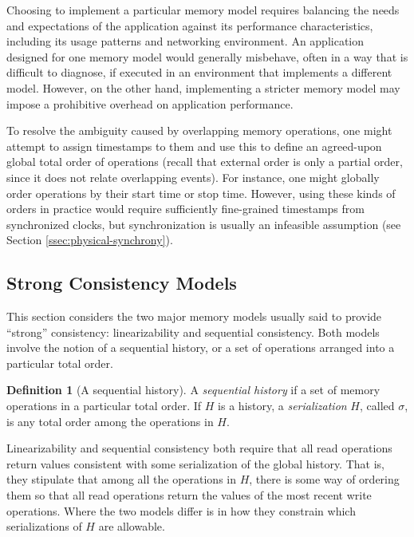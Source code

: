 \documentclass[]             %
{NASA}                       %
\theoremstyle{definition}
\newtheorem{definition}[theorem]{Definition}
\begin{document}
Choosing to implement a particular memory model requires balancing the
needs and expectations of the application against its performance
characteristics, including its usage patterns and networking
environment. An application designed for one memory model would
generally misbehave, often in a way that is difficult to diagnose, if
executed in an environment that implements a different model. However,
on the other hand, implementing a stricter memory model may impose a
prohibitive overhead on application performance.

To resolve the ambiguity caused by overlapping memory operations, one
might attempt to assign timestamps to them and use this to define an
agreed-upon global total order of operations (recall that external
order is only a partial order, since it does not relate overlapping
events). For instance, one might globally order operations by their
start time or stop time. However, using these kinds of orders in
practice would require sufficiently fine-grained timestamps from
synchronized clocks, but synchronization is usually an infeasible
assumption (see Section
\ref{ssec:physical-synchrony}). %

\subsection{Strong Consistency Models}
\label{ssec:strong-consistency}
This section considers the two major memory models usually said to
provide ``strong'' consistency: linearizability and sequential
consistency. Both models involve the notion of a sequential history,
or a set of operations arranged into a particular total order.

\begin{definition}[A sequential history]
  \label{def:sequential-history}
  A \emph{sequential history} if a set of memory operations in a
  particular total order. If $H$ is a history, a \emph{serialization}
  $H$, called $\sigma$, is any total order among the operations in
  $H$.
\end{definition}

Linearizability and sequential consistency both require that all read
operations return values consistent with some serialization of the
global history. That is, they stipulate that among all the operations
in $H$, there is some way of ordering them so that all read operations
return the values of the most recent write operations. Where the two
models differ is in how they constrain which serializations of $H$ are
allowable.
\end{document}
